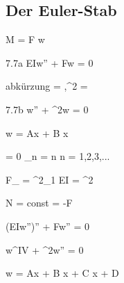 \documentclass[11pt]{article}
\newcommand{\1}{ {\mathds{1}} }
\begin{document}
\begin{multicols}{3}
		\subsection{Der Euler-Stab}

		\begin{formel}{7.6}
			M = F w
		\end{formel}
		\begin{formel}{7.7a}
			EIw'' + Fw = 0
		\end{formel}
		\nopagebreak
		\begin{formel}{abkürzung}
			\lambda = ,\quad \lambda^2 = 
		\end{formel}
		\nopagebreak
		\begin{formel}{7.7b}
			w'' + \lambda^2w = 0
		\end{formel}
		\begin{formel}{7.8}
			w = A\cos \lambda x + B \sin \lambda x
		\end{formel}
		\begin{formel}{7.9}
			\sin \lambda \ell = 0 
			\rightarrow
			\lambda_n \ell = n \pi
			\quad \text{mit} \quad
			n = 1,2,3,...
		\end{formel}
		\begin{formel}{7.10}
			F_{} = \lambda^2_1 EI = \pi^2\frac{EI}{\ell^2}
		\end{formel}
		\begin{formel}{7.11}
			N = const = -F
		\end{formel}
		\begin{formel}{7.12}
			\left(EIw''\right)'' + Fw'' = 0
		\end{formel}
		\begin{formel}{7.13}
			w^{IV} + \lambda^2w'' = 0
		\end{formel}
		\begin{formel}{7.14}
			w = A\cos \lambda x + B \sin \lambda x + C \lambda x + D
		\end{formel}
	

\end{multicols}
\end{document}
